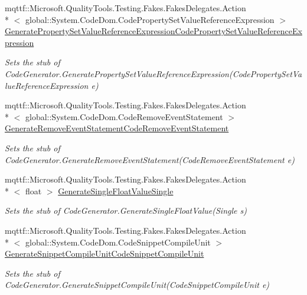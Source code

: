 \begin{DoxyCompactItemize}
mqttf\-::\-Microsoft.\-Quality\-Tools.\-Testing.\-Fakes.\-Fakes\-Delegates.\-Action\\*
$<$ global\-::\-System.\-Code\-Dom.\-Code\-Property\-Set\-Value\-Reference\-Expression $>$ \hyperlink{class_system_1_1_code_dom_1_1_compiler_1_1_fakes_1_1_stub_code_generator_aaa570286a384e9ff2ffb3fd1e41081d6}{Generate\-Property\-Set\-Value\-Reference\-Expression\-Code\-Property\-Set\-Value\-Reference\-Expression}
\begin{DoxyCompactList}\small\item\em Sets the stub of Code\-Generator.\-Generate\-Property\-Set\-Value\-Reference\-Expression(\-Code\-Property\-Set\-Value\-Reference\-Expression e)\end{DoxyCompactList}\item 
mqttf\-::\-Microsoft.\-Quality\-Tools.\-Testing.\-Fakes.\-Fakes\-Delegates.\-Action\\*
$<$ global\-::\-System.\-Code\-Dom.\-Code\-Remove\-Event\-Statement $>$ \hyperlink{class_system_1_1_code_dom_1_1_compiler_1_1_fakes_1_1_stub_code_generator_a5d136e85de234bed573c1bea688d4795}{Generate\-Remove\-Event\-Statement\-Code\-Remove\-Event\-Statement}
\begin{DoxyCompactList}\small\item\em Sets the stub of Code\-Generator.\-Generate\-Remove\-Event\-Statement(\-Code\-Remove\-Event\-Statement e)\end{DoxyCompactList}\item 
mqttf\-::\-Microsoft.\-Quality\-Tools.\-Testing.\-Fakes.\-Fakes\-Delegates.\-Action\\*
$<$ float $>$ \hyperlink{class_system_1_1_code_dom_1_1_compiler_1_1_fakes_1_1_stub_code_generator_aef6c34acfb2777b5da8e6009ae878634}{Generate\-Single\-Float\-Value\-Single}
\begin{DoxyCompactList}\small\item\em Sets the stub of Code\-Generator.\-Generate\-Single\-Float\-Value(\-Single s)\end{DoxyCompactList}\item 
mqttf\-::\-Microsoft.\-Quality\-Tools.\-Testing.\-Fakes.\-Fakes\-Delegates.\-Action\\*
$<$ global\-::\-System.\-Code\-Dom.\-Code\-Snippet\-Compile\-Unit $>$ \hyperlink{class_system_1_1_code_dom_1_1_compiler_1_1_fakes_1_1_stub_code_generator_aa8f2fcf2e968d6587569baef3dbda6f9}{Generate\-Snippet\-Compile\-Unit\-Code\-Snippet\-Compile\-Unit}
\begin{DoxyCompactList}\small\item\em Sets the stub of Code\-Generator.\-Generate\-Snippet\-Compile\-Unit(\-Code\-Snippet\-Compile\-Unit e)\end{DoxyCompactList}\item 

\end{DoxyCompactItemize}
